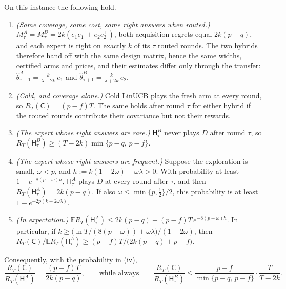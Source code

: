 \documentclass[anon]{alt2027} %
\newcommand{\E}{\mathbb{E}}
\newcommand{\Cold}{\mathsf{C}}
\newcommand{\Hyb}{\mathsf{H}}
\begin{document}
\begin{theorem}
\label{thm:transfer-separation}
On this instance the following hold.
\begin{enumerate}[itemsep=1pt,topsep=1pt,leftmargin=*]
\item[(i)] \emph{(Same coverage, same cost, same right answers when routed.)}
$M_\tau^{A}=M_\tau^{B}=2k(e_1e_1^\top+e_2e_2^\top)$, both acquisition regrets
equal $2k(p-q)$, and each expert is right on exactly $k$ of its $\tau$ routed
rounds. The two hybrids therefore hand off with the same design matrix, hence
the same widths, certified arms and prices, and their estimates differ
only through the transfer:
$\widehat\theta^{A}_{\tau+1}=\frac{k}{\lambda+2k}\,e_1$ and
$\widehat\theta^{B}_{\tau+1}=\frac{k}{\lambda+2k}\,e_2$.
\item[(ii)] \emph{(Cold, and coverage alone.)} Cold LinUCB plays the fresh arm
at every round, so $R_T(\Cold)=(p-f)T$. The same holds after round $\tau$ for
either hybrid if the routed rounds contribute their covariance but not their
rewards.
\item[(iii)] \emph{(The expert whose right answers are rare.)}
$\Hyb^{B}_\tau$ never plays $D$ after round $\tau$, so
$R_T(\Hyb^{B}_\tau)\ge(T-2k)\min\{p-q,\,p-f\}$.
\item[(iv)] \emph{(The expert whose right answers are frequent.)} Suppose the
exploration is small, $\omega<p$, and $h:=k(1-2\omega)-\omega\lambda>0$. With
probability at least $1-e^{-8(p-\omega)h}$, $\Hyb^{A}_\tau$ plays $D$ at every
round after $\tau$, and then $R_T(\Hyb^{A}_\tau)=2k(p-q)$. If also
$\omega\le\min\{p,\tfrac12\}/2$, this probability is at least
$1-e^{-2p(k-2\omega\lambda)}$.
\item[(v)] \emph{(In expectation.)}
$\E R_T(\Hyb^{A}_\tau)\le2k(p-q)+(p-f)T\,e^{-8(p-\omega)h}$. In particular, if
$k\ge\bigl(\ln T/(8(p-\omega))+\omega\lambda\bigr)/(1-2\omega)$, then
$R_T(\Cold)/\E R_T(\Hyb^{A}_\tau)\ge(p-f)T/\bigl(2k(p-q)+p-f\bigr)$.
\end{enumerate}
Consequently, with the probability in (iv),
\[
\frac{R_T(\Cold)}{R_T(\Hyb^{A}_\tau)}=\frac{(p-f)T}{2k(p-q)},
\qquad\text{while always}\qquad
\frac{R_T(\Cold)}{R_T(\Hyb^{B}_\tau)}\le\frac{p-f}{\min\{p-q,\,p-f\}}\cdot\frac{T}{T-2k}.
\]
\end{theorem}
\end{document}
